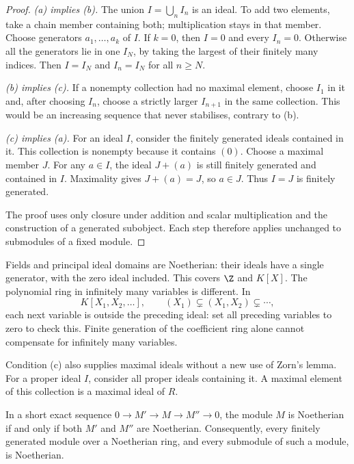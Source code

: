 \begin{proof}
\emph{(a) implies (b).} The union $I=\bigcup_n I_n$ is an ideal. To add two elements, take a chain member containing both; multiplication stays in that member. Choose generators $a_1,\ldots,a_k$ of $I$. If $k=0$, then $I=0$ and every $I_n=0$. Otherwise all the generators lie in one $I_N$, by taking the largest of their finitely many indices. Then $I=I_N$ and $I_n=I_N$ for all $n\ge N$.

\emph{(b) implies (c).} If a nonempty collection had no maximal element, choose $I_1$ in it and, after choosing $I_n$, choose a strictly larger $I_{n+1}$ in the same collection. This would be an increasing sequence that never stabilises, contrary to (b).

\emph{(c) implies (a).} For an ideal $I$, consider the finitely generated ideals contained in it. This collection is nonempty because it contains $(0)$. Choose a maximal member $J$. For any $a\in I$, the ideal $J+(a)$ is still finitely generated and contained in $I$. Maximality gives $J+(a)=J$, so $a\in J$. Thus $I=J$ is finitely generated.

The proof uses only closure under addition and scalar multiplication and the construction of a generated subobject. Each step therefore applies unchanged to submodules of a fixed module.
\end{proof}

Fields and principal ideal domains are Noetherian: their ideals have a single generator, with the zero ideal included. This covers $\Z$ and $K[X]$. The polynomial ring in infinitely many variables is different. In
\[
K[X_1,X_2,\ldots],\qquad
(X_1)\subsetneq(X_1,X_2)\subsetneq\cdots,
\]
each next variable is outside the preceding ideal: set all preceding variables to zero to check this. Finite generation of the coefficient ring alone cannot compensate for infinitely many variables.

Condition (c) also supplies maximal ideals without a new use of Zorn's lemma. For a proper ideal $I$, consider all proper ideals containing it. A maximal element of this collection is a maximal ideal of $R$.

\begin{proposition}\label{prop:noethmodules}
In a short exact sequence $0\to M'\to M\to M''\to0$, the module $M$ is Noetherian if and only if both $M'$ and $M''$ are Noetherian. Consequently, every finitely generated module over a Noetherian ring, and every submodule of such a module, is Noetherian.
\end{proposition}

